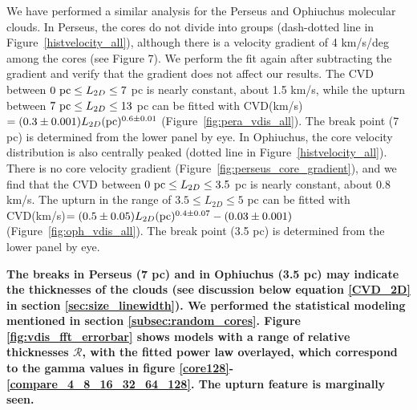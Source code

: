 \documentclass[iop,revtex4]{emulateapj}
\begin{document}
We have performed a similar analysis for the Perseus and Ophiuchus molecular clouds. In Perseus, the cores do not divide into groups (dash-dotted line in Figure~\ref{histvelocity_all}), although there is a velocity gradient of 4 km/s/deg among the cores (see Figure 7). We perform the fit again after subtracting the gradient and verify that the gradient does not affect our results. The CVD between $0\ {\rm pc}\leq L_{2D} \leq 7$ pc is nearly constant, about 1.5 km/s, while the upturn between $7\ {\rm pc}\leq L_{2D} \leq 13$ pc can be fitted with CVD(km/s)$=(0.3\pm 0.001)L_{2D} ({\rm pc})^{0.6\pm 0.01}$ (Figure~\ref{fig:pera_vdis_all}). The break point (7 pc) is determined from the lower panel by eye. In Ophiuchus, the core velocity distribution is also centrally peaked (dotted line in Figure~\ref{histvelocity_all}). There is no core velocity gradient (Figure~\ref{fig:perseus_core_gradient}), and we find that the  CVD between $0\ {\rm pc}\leq L_{2D} \leq 3.5$ pc is nearly constant, about 0.8 km/s. The upturn in the range of $3.5\leq L_{2D} \leq 5$  pc can be fitted with CVD(km/s)$=(0.5\pm 0.05)L_{2D} ({\rm pc})^{0.4\pm 0.07}-(0.03\pm 0.001)$ (Figure~\ref{fig:oph_vdis_all}). The break point (3.5 pc) is determined from the lower panel by eye.

{\bf The breaks in Perseus (7 pc) and in Ophiuchus (3.5 pc) may indicate the thicknesses of the clouds (see discussion below equation \ref{CVD_2D} in section \ref{sec:size_linewidth}). We performed the statistical modeling mentioned in section \ref{subsec:random_cores}. Figure \ref{fig:vdis_fft_errorbar} shows models with a range of relative thicknesses $\mathcal{R}$, with the fitted power law overlayed, which correspond to the gamma values in figure \ref{core128}-\ref{compare_4_8_16_32_64_128}. The upturn feature is marginally seen.}
\end{document}
